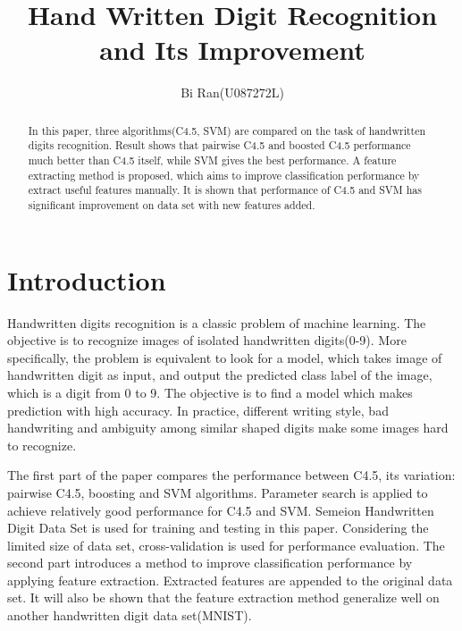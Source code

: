 \documentclass[a4paper,11pt]{article}
\author{Bi Ran(U087272L)}
\title{Hand Written Digit Recognition and Its Improvement}
\begin{document}
\maketitle
\begin{abstract}
In this paper, three algorithms(C4.5, SVM) are compared on the task of handwritten digits recognition. Result shows that pairwise C4.5 and boosted C4.5 performance much better than C4.5 itself, while SVM gives the best performance. A feature extracting method is proposed, which aims to improve classification performance by extract useful features manually. It is shown that performance of C4.5 and SVM has significant improvement on data set with new features added.
\end{abstract}
\section{Introduction}
 Handwritten digits recognition is a classic problem of machine learning. The objective is to recognize images of isolated handwritten digits(0-9). More specifically, the problem is equivalent to look for a model, which takes image of handwritten digit as input, and output the predicted class label of the image, which is a digit from 0 to 9. The objective is to find a model which makes prediction with high accuracy. In practice, different writing style, bad handwriting and ambiguity among similar shaped digits make some images hard to recognize.
 
 The first part of the paper compares the performance between C4.5, its variation: pairwise C4.5, boosting and SVM algorithms. Parameter search is applied to achieve relatively good performance for C4.5 and SVM. Semeion Handwritten Digit Data Set is used for training and testing in this paper. Considering the limited size of data set, cross-validation is used for performance evaluation. The second part introduces a method to improve classification performance by applying feature extraction. Extracted features are appended to the original data set. It will also be shown that the feature extraction method generalize well on another handwritten digit data set(MNIST).
\end{document}
